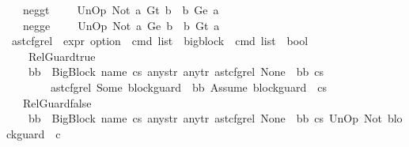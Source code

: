\begin{isabellebody}
\ \ {\isacharbar}{\kern0pt}\ neg{\isacharunderscore}{\kern0pt}gt{\isacharcolon}{\kern0pt}\ \ \ \ \ {\isachardoublequoteopen}UnOp\ Not\ {\isacharparenleft}{\kern0pt}a\ {\isasymguillemotleft}Gt{\isasymguillemotright}\ b{\isacharparenright}{\kern0pt}\ {\isasymsim}\ {\isacharparenleft}{\kern0pt}b\ {\isasymguillemotleft}Ge{\isasymguillemotright}\ a{\isacharparenright}{\kern0pt}{\isachardoublequoteclose}\isanewline
\ \ {\isacharbar}{\kern0pt}\ neg{\isacharunderscore}{\kern0pt}ge{\isacharcolon}{\kern0pt}\ \ \ \ \ {\isachardoublequoteopen}UnOp\ Not\ {\isacharparenleft}{\kern0pt}a\ {\isasymguillemotleft}Ge{\isasymguillemotright}\ b{\isacharparenright}{\kern0pt}\ {\isasymsim}\ {\isacharparenleft}{\kern0pt}b\ {\isasymguillemotleft}Gt{\isasymguillemotright}\ a{\isacharparenright}{\kern0pt}{\isachardoublequoteclose}\isanewline
\isanewline
{}\isamarkupfalse%
\ ast{\isacharunderscore}{\kern0pt}cfg{\isacharunderscore}{\kern0pt}rel\ {\isacharcolon}{\kern0pt}{\isacharcolon}{\kern0pt}\ {\isachardoublequoteopen}expr\ option\ {\isasymRightarrow}\ cmd\ list\ {\isasymRightarrow}\ bigblock\ {\isasymRightarrow}\ cmd\ list\ {\isasymRightarrow}\ bool{\isachardoublequoteclose}\isanewline
\ \ \ \isanewline
\ \ \ \ Rel{\isacharunderscore}{\kern0pt}Guard{\isacharunderscore}{\kern0pt}true{\isacharcolon}{\kern0pt}\isanewline
\ \ \ \ {\isachardoublequoteopen}{\isasymlbrakk}bb\ {\isacharequal}{\kern0pt}\ {\isacharparenleft}{\kern0pt}BigBlock\ name\ cs{}\ any{\isacharunderscore}{\kern0pt}str\ any{\isacharunderscore}{\kern0pt}tr{\isacharparenright}{\kern0pt}{\isacharsemicolon}{\kern0pt}\ ast{\isacharunderscore}{\kern0pt}cfg{\isacharunderscore}{\kern0pt}rel\ None\ {\isacharbrackleft}{\kern0pt}{\isacharbrackright}{\kern0pt}\ bb\ cs{}{\isasymrbrakk}\ {\isasymLongrightarrow}\isanewline
\ \ \ \ \ \ \ \ ast{\isacharunderscore}{\kern0pt}cfg{\isacharunderscore}{\kern0pt}rel\ {\isacharparenleft}{\kern0pt}Some\ block{\isacharunderscore}{\kern0pt}guard{\isacharparenright}{\kern0pt}\ {\isacharbrackleft}{\kern0pt}{\isacharbrackright}{\kern0pt}\ bb\ {\isacharparenleft}{\kern0pt}{\isacharparenleft}{\kern0pt}Assume\ block{\isacharunderscore}{\kern0pt}guard{\isacharparenright}{\kern0pt}\ {\isacharhash}{\kern0pt}\ cs{}{\isacharparenright}{\kern0pt}{\isachardoublequoteclose}\isanewline
\ \ {\isacharbar}{\kern0pt}\ Rel{\isacharunderscore}{\kern0pt}Guard{\isacharunderscore}{\kern0pt}false{\isacharcolon}{\kern0pt}\isanewline
\ \ \ \ {\isachardoublequoteopen}{\isasymlbrakk}bb\ {\isacharequal}{\kern0pt}\ {\isacharparenleft}{\kern0pt}BigBlock\ name\ cs{}\ any{\isacharunderscore}{\kern0pt}str\ any{\isacharunderscore}{\kern0pt}tr{\isacharparenright}{\kern0pt}{\isacharsemicolon}{\kern0pt}\ ast{\isacharunderscore}{\kern0pt}cfg{\isacharunderscore}{\kern0pt}rel\ None\ {\isacharbrackleft}{\kern0pt}{\isacharbrackright}{\kern0pt}\ bb\ cs{}{\isacharsemicolon}{\kern0pt}\ {\isacharparenleft}{\kern0pt}UnOp\ Not\ block{\isacharunderscore}{\kern0pt}guard{\isacharparenright}{\kern0pt}\ {\isasymsim}\ c\ {\isasymrbrakk}\ {\isasymLongrightarrow}\isanewline

\end{isabellebody}
